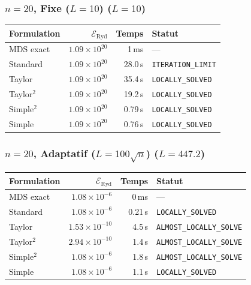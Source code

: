 \subsubsection{$n=20$, Fixe ($L{=}10$) ($L=10$)}
\begin{longtable}{@{}lrrl@{}}
  \toprule
  Formulation & $\mathcal{E}_{\mathrm{Ryd}}$ & Temps & Statut \\
  \midrule
  \endhead
  MDS exact & $1.09\times10^{20}$ & 1\,ms & --- \\
  Standard & $1.09\times10^{20}$ & 28.0\,s & \texttt{ITERATION\_LIMIT} \\
  Taylor & $1.09\times10^{20}$ & 35.4\,s & \texttt{LOCALLY\_SOLVED} \\
  Taylor$^2$ & $1.09\times10^{20}$ & 19.2\,s & \texttt{LOCALLY\_SOLVED} \\
  Simple$^2$ & $1.09\times10^{20}$ & 0.79\,s & \texttt{LOCALLY\_SOLVED} \\
  Simple & $1.09\times10^{20}$ & 0.76\,s & \texttt{LOCALLY\_SOLVED} \\
  \bottomrule
\end{longtable}

\subsubsection{$n=20$, Adaptatif ($L{=}100\sqrt{n}$) ($L=447.2$)}
\begin{longtable}{@{}lrrl@{}}
  \toprule
  Formulation & $\mathcal{E}_{\mathrm{Ryd}}$ & Temps & Statut \\
  \midrule
  \endhead
  MDS exact & $1.08\times10^{-6}$ & 0\,ms & --- \\
  Standard & $1.08\times10^{-6}$ & 0.21\,s & \texttt{LOCALLY\_SOLVED} \\
  Taylor & $1.53\times10^{-10}$ & 4.5\,s & \texttt{ALMOST\_LOCALLY\_SOLVE} \\
  Taylor$^2$ & $2.94\times10^{-10}$ & 1.4\,s & \texttt{ALMOST\_LOCALLY\_SOLVE} \\
  Simple$^2$ & $1.08\times10^{-6}$ & 1.8\,s & \texttt{ALMOST\_LOCALLY\_SOLVE} \\
  Simple & $1.08\times10^{-6}$ & 1.1\,s & \texttt{LOCALLY\_SOLVED} \\
  \bottomrule
\end{longtable}


